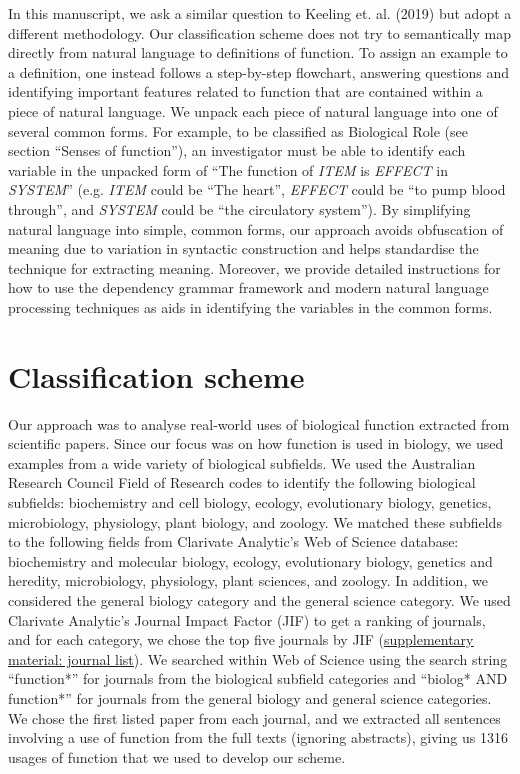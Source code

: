 \documentclass{article}
\begin{document}
In this manuscript, we ask a similar question to Keeling et. al. (2019) but adopt a different methodology.
Our classification scheme does not try to semantically map directly from natural language to definitions of function.
To assign an example to a definition, one instead follows a step-by-step flowchart, answering questions and identifying important features related to function that are contained within a piece of natural language.
We unpack each piece of natural language into one of several common forms.
For example, to be classified as Biological Role (see section ``Senses of function''), an investigator must be able to identify each variable in the unpacked form of ``The function of \emph{ITEM} is \emph{EFFECT} in \emph{SYSTEM}'' (e.g. \emph{ITEM} could be ``The heart'', \emph{EFFECT} could be ``to pump blood through'', and \emph{SYSTEM} could be ``the circulatory system'').
By simplifying natural language into simple, common forms, our approach avoids obfuscation of meaning due to variation in syntactic construction and helps standardise the technique for extracting meaning.
Moreover, we provide detailed instructions for how to use the dependency grammar framework and modern natural language processing techniques as aids in identifying the variables in the common forms.

\section{Classification scheme}
\label{sec:class-scheme}

Our approach was to analyse real-world uses of biological function extracted from scientific papers.
Since our focus was on how function is used in biology, we used examples from a wide variety of biological subfields.
We used the Australian Research Council Field of Research codes to identify the following biological subfields: biochemistry and cell biology, ecology, evolutionary biology, genetics, microbiology, physiology, plant biology, and zoology.
We matched these subfields to the following fields from Clarivate Analytic’s Web of Science database: biochemistry and molecular biology, ecology, evolutionary biology, genetics and heredity, microbiology, physiology, plant sciences, and zoology.
In addition, we considered the general biology category and the general science category.
We used Clarivate Analytic’s Journal Impact Factor (JIF) to get a ranking of journals, and for each category, we chose the top five journals by JIF (\href{https://github.com/joshuachristie/function-concepts/blob/master/supplementary_material/list_of_journals.txt}{\underline{supplementary material: journal list}}).
We searched within Web of Science using the search string ``function*'' for journals from the biological subfield categories and ``biolog* AND function*'' for journals from the general biology and general science categories.
We chose the first listed paper from each journal, and we extracted all sentences involving a use of function from the full texts (ignoring abstracts), giving us 1316 usages of function that we used to develop our scheme.
\end{document}
